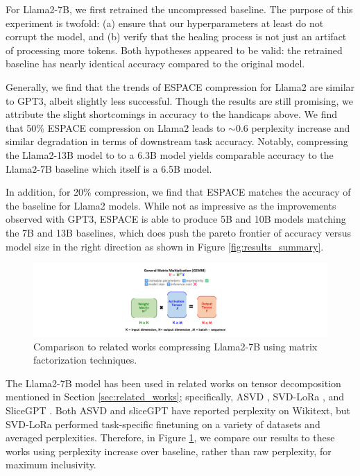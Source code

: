 \documentclass{article}
\theoremstyle{plain}
\begin{document}
For Llama2-7B, we first retrained the uncompressed baseline. The purpose of this experiment is twofold: (a) ensure that our hyperparameters at least do not corrupt the model, and (b) verify that the healing process is not just an artifact of processing more tokens. Both hypotheses appeared to be valid: the retrained baseline has nearly identical accuracy compared to the original model.

Generally, we find that the trends of ESPACE compression for Llama2 are similar to GPT3, albeit slightly less successful. Though the results are still promising, we attribute the slight shortcomings in accuracy to the handicaps above. We find that 50\% ESPACE compression on Llama2 leads to $\sim$0.6 perplexity increase and similar degradation in terms of downstream task accuracy. Notably, compressing the Llama2-13B model to to a 6.3B model yields comparable accuracy to the Llama2-7B baseline which itself is a 6.5B model.

In addition, for 20\% compression, we find that ESPACE matches the accuracy of the baseline for Llama2 models. While not as impressive as the improvements observed with GPT3, ESPACE is able to produce 5B and 10B models matching the 7B and 13B baselines, which does push the pareto frontier of accuracy versus model size in the right direction as shown in Figure \ref{fig:results_summary}.

\begin{figure}
\begin{center}
    \includegraphics[trim=24.5cm 0cm 28.5cm 5cm, clip, width=0.9\linewidth, page=9]{espace_paper_figures.pdf}
\end{center}
\caption{\footnotesize Comparison to related works compressing Llama2-7B using matrix factorization techniques.}
\label{fig:llama2-7b}
\end{figure}


The Llama2-7B model has been used in related works on tensor decomposition mentioned in Section \ref{sec:related_works}; specifically, ASVD \cite{yuan2023asvd}, SVD-LoRa \cite{Badri_Shaji_2024}, and SliceGPT \cite{ashkboos2024slicegpt}. Both ASVD and sliceGPT have reported perplexity on Wikitext, but SVD-LoRa performed task-specific finetuning on a variety of datasets and averaged perplexities. Therefore, in Figure \ref{fig:llama2-7b}, we compare our results to these works using perplexity increase over baseline, rather than raw perplexity, for maximum inclusivity.
\end{document}
